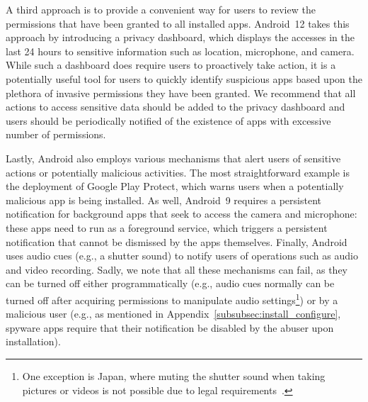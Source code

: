 A third approach is to provide a convenient way for users to review the
permissions that have been granted to all installed apps.  Android~12 takes this
approach by introducing a privacy dashboard, which displays the
accesses in the last 24 hours to sensitive information such as location, microphone, and camera.
While such a dashboard does require users to proactively
take action, it is a potentially useful tool for users to quickly identify
suspicious apps based upon the plethora of invasive permissions they have been
granted. We
recommend that all actions to access sensitive data should be added to the
privacy dashboard and users should be periodically notified of the existence of apps with excessive number of permissions.

Lastly, Android also employs various mechanisms that alert users of sensitive actions or potentially malicious activities. 
The most straightforward example is the deployment of Google Play Protect, which warns users when a potentially malicious app is being installed. As well, Android~9 requires a persistent notification for background apps that seek to access the camera and microphone: these apps need to run as a foreground service, which triggers a persistent notification that cannot be dismissed by the apps themselves. Finally, Android uses audio cues (e.g., a shutter sound) to notify users of operations such as audio and video recording. Sadly, we note that all these mechanisms can fail, as they can be turned off either programmatically (e.g., audio cues normally can be
turned off after acquiring permissions to manipulate audio
settings\footnote{One exception is Japan, where muting the shutter sound when
taking pictures or videos is not possible due to legal
requirements~\cite{HowcanIt38:online}.}) or by a malicious user (e.g., as mentioned in Appendix~\ref{subsubsec:install_configure}, spyware apps require that their notification be disabled by the abuser upon installation).


